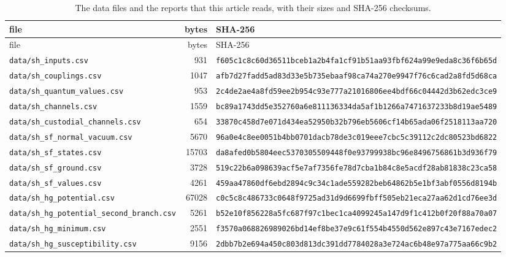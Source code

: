 \documentclass[aps,prd,onecolumn,superscriptaddress,nofootinbib,floatfix,longbibliography]{revtex4-2}
\begin{document}
\begingroup\footnotesize\setlength{\tabcolsep}{4pt}
\begin{longtable}{lrl}
\caption{\label{tab:files}The data files and the reports that this article reads, with their sizes and SHA-256 checksums.}\\
\hline\hline file & bytes & SHA-256 \\ \hline
\endfirsthead
\hline file & bytes & SHA-256 \\ \hline
\endhead
\hline\hline
\endlastfoot
\texttt{data/sh\_inputs.csv} & 931 & \texttt{\scriptsize f605c1c8c60d36511bceb1a2b4fa1cf91b51aa93fbf624a99e9eda8c36f6b65d} \\
\texttt{data/sh\_couplings.csv} & 1047 & \texttt{\scriptsize afb7d27fadd5ad83d33e5b735ebaaf98ca74a270e9947f76c6cad2a8fd5d68ca} \\
\texttt{data/sh\_quantum\_values.csv} & 953 & \texttt{\scriptsize 2c4de2ae4a8fd59ee2b954c93e777a21016806ee4bdf66c04442d3b62edc3ce9} \\
\texttt{data/sh\_channels.csv} & 1559 & \texttt{\scriptsize bc89a1743dd5e352760a6e811136334da5af1b1266a7471637233b8d19ae5489} \\
\texttt{data/sh\_custodial\_channels.csv} & 654 & \texttt{\scriptsize 33870c458d7e071d434ea52950b32b796eb5606cf14b65ada06f2518113aa720} \\
\texttt{data/sh\_sf\_normal\_vacuum.csv} & 5670 & \texttt{\scriptsize 96a0e4c8ee0051b4bb0701dacb78de3c019eee7cbc5c39112c2dc80523bd6822} \\
\texttt{data/sh\_sf\_states.csv} & 15703 & \texttt{\scriptsize da8afed0b5804eec5370305509448f0e93799938bc96e8496756861b3d936f79} \\
\texttt{data/sh\_sf\_ground.csv} & 3728 & \texttt{\scriptsize 519c22b6a098639acf5e7af7356fe78d7cba1b84c8e5acdf28ab81838c23ca58} \\
\texttt{data/sh\_sf\_values.csv} & 4261 & \texttt{\scriptsize 459aa47860df6ebd2894c9c34c1ade559282beb64862b5e1bf3abf0556d8194b} \\
\texttt{data/sh\_hg\_potential.csv} & 67028 & \texttt{\scriptsize c0c5c8c486733c0648f9725ad31d9d6699fbff505eb21eca27aa62d1cd76ee3d} \\
\texttt{data/sh\_hg\_potential\_second\_branch.csv} & 5261 & \texttt{\scriptsize b52e10f856228a5fc687f97c1bec1ca4099245a147d9f1c412b0f20f88a70a07} \\
\texttt{data/sh\_hg\_minimum.csv} & 2551 & \texttt{\scriptsize f3570a068826989026bd14ef8be37e9c61f554b4550d562e897c43e7167edec2} \\
\texttt{data/sh\_hg\_susceptibility.csv} & 9156 & \texttt{\scriptsize 2dbb7b2e694a450c803d813dc391dd7784028a3e724ac6b48e97a775aa66c9b2} \\

\end{longtable}
\end{document}
